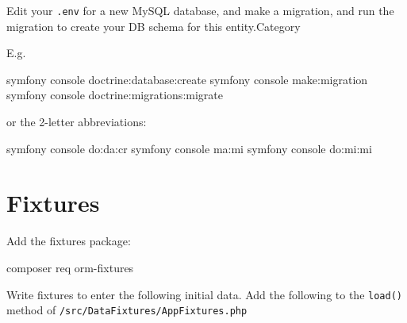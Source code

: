 \documentclass[a4paperpaper,openright]{book}
\newenvironment{Shaded}{}{}
\newcommand{\ExtensionTok}[1]{#1}
\newcommand{\NormalTok}[1]{#1}
\begin{document}
Edit your \texttt{.env} for a new MySQL database, and make a migration,
and run the migration to create your DB schema for this entity.Category

E.g.

\begin{Shaded}
\begin{Highlighting}[]
     \ExtensionTok{symfony}\NormalTok{ console doctrine:database:create}
     \ExtensionTok{symfony}\NormalTok{ console make:migration}
     \ExtensionTok{symfony}\NormalTok{ console doctrine:migrations:migrate}
\end{Highlighting}
\end{Shaded}

or the 2-letter abbreviations:

\begin{Shaded}
\begin{Highlighting}[]
     \ExtensionTok{symfony}\NormalTok{ console do:da:cr}
     \ExtensionTok{symfony}\NormalTok{ console ma:mi}
     \ExtensionTok{symfony}\NormalTok{ console do:mi:mi}
\end{Highlighting}
\end{Shaded}

\hypertarget{fixtures}{%
\section{Fixtures}\label{fixtures}}

Add the fixtures package:

\begin{Shaded}
\begin{Highlighting}[]
     \ExtensionTok{composer}\NormalTok{ req orm-fixtures}
\end{Highlighting}
\end{Shaded}

Write fixtures to enter the following initial data. Add the following to
the \texttt{load()} method of \texttt{/src/DataFixtures/AppFixtures.php}
\end{document}
